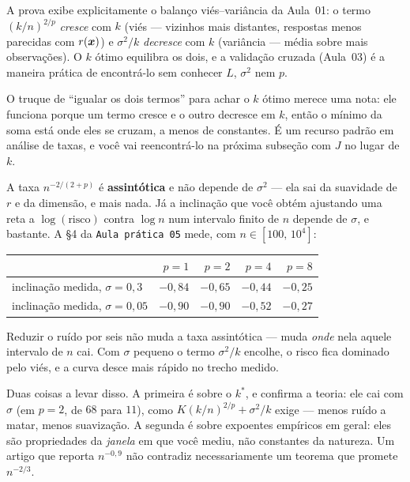 \documentclass[11pt,a4paper]{article}
\begin{document}
\begin{ideia}
A prova exibe explicitamente o balanço viés--variância da Aula~01: o termo
$(k/n)^{2/p}$ \emph{cresce} com $k$ (viés --- vizinhos mais distantes, respostas
menos parecidas com $r(\bm{x})$) e $\sigma^2/k$ \emph{decresce} com $k$ (variância ---
média sobre mais observações). O $k$ ótimo equilibra os dois, e a validação cruzada
(Aula~03) é a maneira prática de encontrá-lo sem conhecer $L$, $\sigma^2$ nem $p$.
\end{ideia}

\begin{observacao}
O truque de ``igualar os dois termos'' para achar o $k$ ótimo merece uma nota: ele
funciona porque um termo cresce e o outro decresce em $k$, então o mínimo da soma
está onde eles se cruzam, a menos de constantes. É um recurso padrão em análise de
taxas, e você vai reencontrá-lo na próxima subseção com $J$ no lugar de $k$.
\end{observacao}

\begin{atencao}
A taxa $n^{-2/(2+p)}$ é \textbf{assintótica} e não depende de $\sigma^2$ --- ela sai
da suavidade de $r$ e da dimensão, e mais nada. Já a inclinação que você obtém
ajustando uma reta a $\log(\text{risco})$ contra $\log n$ num intervalo finito de
$n$ depende de $\sigma$, e bastante. A §4 da \texttt{Aula prática 05} mede, com
$n\in[100,\,10^4]$:

\begin{center}\small
\begin{tabular}{lrrrr}
\toprule
 & $p=1$ & $p=2$ & $p=4$ & $p=8$ \\
\midrule
inclinação medida, $\sigma=0{,}3$  & $-0{,}84$ & $-0{,}65$ & $-0{,}44$ & $-0{,}25$ \\
inclinação medida, $\sigma=0{,}05$ & $-0{,}90$ & $-0{,}90$ & $-0{,}52$ & $-0{,}27$ \\
\bottomrule
\end{tabular}
\end{center}

Reduzir o ruído por seis não muda a taxa assintótica --- muda \emph{onde} nela
aquele intervalo de $n$ cai. Com $\sigma$ pequeno o termo $\sigma^2/k$ encolhe, o
risco fica dominado pelo viés, e a curva desce mais rápido no trecho medido.

Duas coisas a levar disso. A primeira é sobre o $k^*$, e confirma a teoria: ele cai
com $\sigma$ (em $p=2$, de $68$ para $11$), como $K(k/n)^{2/p}+\sigma^2/k$ exige ---
menos ruído a matar, menos suavização. A segunda é sobre expoentes empíricos em
geral: eles são propriedades da \emph{janela} em que você mediu, não constantes da
natureza. Um artigo que reporta $n^{-0{,}9}$ não contradiz necessariamente um
teorema que promete $n^{-2/3}$.
\end{atencao}
\end{document}
